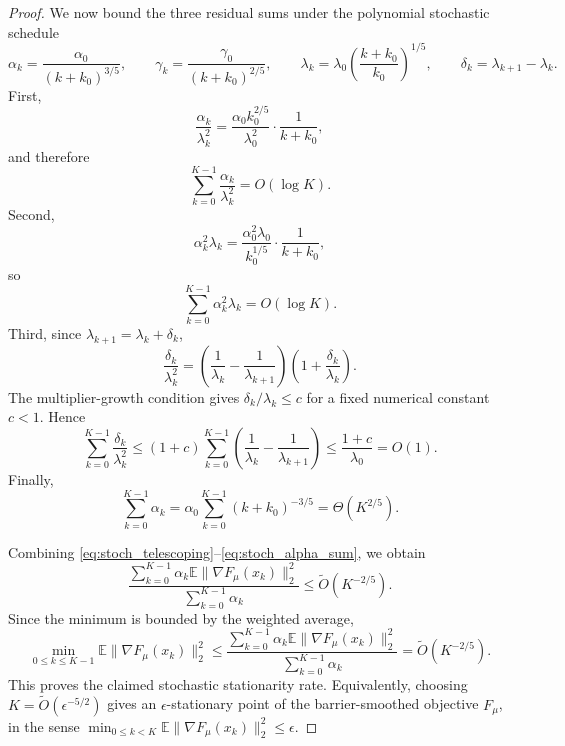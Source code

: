 \documentclass{article}
\begin{document}
\begin{proof}
We now bound the three residual sums under the polynomial stochastic schedule
\[
\alpha_k=\frac{\alpha_0}{(k+k_0)^{3/5}},
\qquad
\gamma_k=\frac{\gamma_0}{(k+k_0)^{2/5}},
\qquad
\lambda_k=\lambda_0\left(\frac{k+k_0}{k_0}\right)^{1/5},
\qquad
\delta_k=\lambda_{k+1}-\lambda_k .
\]
First,
\[
\frac{\alpha_k}{\lambda_k^2}
=
\frac{\alpha_0 k_0^{2/5}}{\lambda_0^2}\cdot\frac{1}{k+k_0},
\]
and therefore
\begin{equation}
\label{eq:stoch_alpha_over_lambda_sum}
\sum_{k=0}^{K-1}\frac{\alpha_k}{\lambda_k^2}
=
O(\log K).
\end{equation}
Second,
\[
\alpha_k^2\lambda_k
=
\frac{\alpha_0^2\lambda_0}{k_0^{1/5}}\cdot\frac{1}{k+k_0},
\]
so
\begin{equation}
\label{eq:stoch_variance_sum}
\sum_{k=0}^{K-1}\alpha_k^2\lambda_k
=
O(\log K).
\end{equation}
Third, since \(\lambda_{k+1}=\lambda_k+\delta_k\),
\[
\frac{\delta_k}{\lambda_k^2}
=
\left(\frac{1}{\lambda_k}-\frac{1}{\lambda_{k+1}}\right)
\left(1+\frac{\delta_k}{\lambda_k}\right).
\]
The multiplier-growth condition gives \(\delta_k/\lambda_k\le c\) for a fixed numerical constant
\(c<1\). Hence
\begin{equation}
\label{eq:stoch_delta_sum}
\sum_{k=0}^{K-1}\frac{\delta_k}{\lambda_k^2}
\le
(1+c)
\sum_{k=0}^{K-1}
\left(\frac{1}{\lambda_k}-\frac{1}{\lambda_{k+1}}\right)
\le
\frac{1+c}{\lambda_0}
=
O(1).
\end{equation}
Finally,
\begin{equation}
\label{eq:stoch_alpha_sum}
\sum_{k=0}^{K-1}\alpha_k
=
\alpha_0\sum_{k=0}^{K-1}(k+k_0)^{-3/5}
=
\Theta(K^{2/5}).
\end{equation}

Combining \eqref{eq:stoch_telescoping}--\eqref{eq:stoch_alpha_sum}, we obtain
\[
\frac{
\sum_{k=0}^{K-1}
\alpha_k\mathbb E\|\nabla F_\mu(x_k)\|_2^2
}{
\sum_{k=0}^{K-1}\alpha_k
}
\le
\widetilde O(K^{-2/5}).
\]
Since the minimum is bounded by the weighted average,
\[
\min_{0\le k\le K-1}
\mathbb E\|\nabla F_\mu(x_k)\|_2^2
\le
\frac{
\sum_{k=0}^{K-1}
\alpha_k\mathbb E\|\nabla F_\mu(x_k)\|_2^2
}{
\sum_{k=0}^{K-1}\alpha_k
}
=
\widetilde O(K^{-2/5}).
\]
This proves the claimed stochastic stationarity rate. Equivalently, choosing
\(K=\widetilde O(\epsilon^{-5/2})\) gives an \(\epsilon\)-stationary point of the
barrier-smoothed objective \(F_\mu\), in the sense
\(\min_{0\le k<K}\mathbb E\|\nabla F_\mu(x_k)\|_2^2\le \epsilon\).
\end{proof}

\newpage
\end{document}
